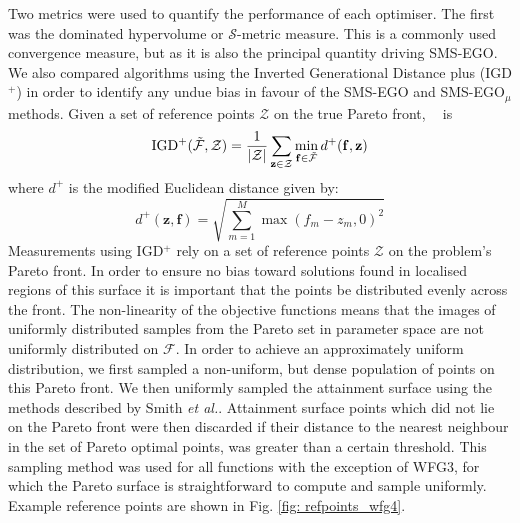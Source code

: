 \documentclass[conference]{IEEEtran}
\makeatletter
\DeclarePairedDelimiter\abs{\lvert}{\rvert}%
\newcommand{\nobj}{M}
\DeclareMathOperator*{\igdp}{IGD^{+}}
\newcommand\hpv{dominated hypervolume\xspace}
\newcommand\smsego{SMS-EGO\xspace}
\newcommand\smsegomu{SMS-EGO$_{\mu}$\xspace}
\newcommand\igd{IGD$^+$\xspace}
\newcommand\mF{\mathcal{F}}
\newcommand\Fapprox{\tilde{\mathcal{F}}}
\newcommand{\pigdref}{\mathcal{Z}}
\newcommand{\bff}{\mathbf{f}}
\newcommand*{\etal}{\textit{et al.}\@\xspace}
\makeatother
\begin{document}
Two metrics were used to quantify the performance of each optimiser. The first was the \hpv or $\mathcal{S}$-metric measure. This is a commonly used convergence measure, but as it is also the principal quantity driving \smsego. We also compared algorithms using the   Inverted Generational Distance plus (\igd) \cite{ishibuchi2015modified} in order to identify any undue bias in favour of the \smsego and \smsegomu methods. Given a set of reference points $\pigdref$ on the true Pareto front, $\igdp$ is
\begin{equation}
    \igdp(\Fapprox, \pigdref) = \frac{1}{\abs{\pigdref}}
    \sum_{\mathbf{z}\in\pigdref} \min_{\bff \in \Fapprox} d^{+}(\bff, \mathbf{z})
\end{equation}
where $d^{+}$ is the modified Euclidean distance given by:
\begin{equation}
    d^+(\mathbf{z}, \mathbf{f}) = \sqrt{\sum^{\nobj}_{m=1}\max(f_m - z_m, 0)^2}
\end{equation}
Measurements using \igd rely on a set of reference points $\pigdref$ on the problem's Pareto front. In order to ensure no bias toward solutions found in localised regions of this surface it is important that the points be distributed evenly across the front. The non-linearity of the objective functions means that the images of  uniformly distributed samples from the Pareto set in parameter space are not uniformly distributed on $\mF$.  In order to achieve an approximately uniform distribution, we first sampled a non-uniform, but dense population of points on this Pareto front.  We then uniformly sampled the attainment surface  using the methods described by Smith \etal \cite{smith2004dominance}. Attainment surface points which did not lie on the Pareto front were then discarded if their distance to the nearest neighbour in the set of Pareto optimal points, was greater than a certain threshold. This sampling method was used for all functions with the exception of WFG3, for which the Pareto surface is straightforward to compute and sample uniformly. Example reference points are shown in Fig. \ref{fig: refpoints_wfg4}.  
\end{document}
